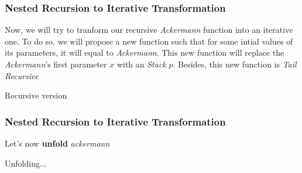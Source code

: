 \documentclass{beamer}
\begin{document}
\begin{frame}
	\frametitle{Nested Recursion to Iterative Transformation}
	Now, we will try to tranform our recursive \textit{Ackermann} function into an iterative one. To do so, we will propose a new function such that for some intial values of its parameters, it will equal to \textit{Ackermann}. This new function will replace the \textit{Ackermann}'s first parameter $x$ with an \textit{Stack} $p$. Besides, this new function is \textit{Tail Recursive}
	\begin{block}{Recursive version}
		\begin{algorithmic}[1]
					\State{}
				\Else
					\State{}
				\EndIf
			\EndProcedure
		\end{algorithmic}
	\end{block}
\end{frame}
\begin{frame}
	\frametitle{Nested Recursion to Iterative Transformation}
	Let's now \textbf{unfold} \textit{ackermann}
	\begin{block}{Unfolding...}
		\begin{algorithmic}[1]
			\tiny
					\State{}
				\Else
						\State{}
					\Else
							\State{}
						\Else
							\State{}
						\EndIf
					\EndIf
				\EndIf
			\EndProcedure
		\end{algorithmic}
	\end{block}
\end{frame}
\end{document}
